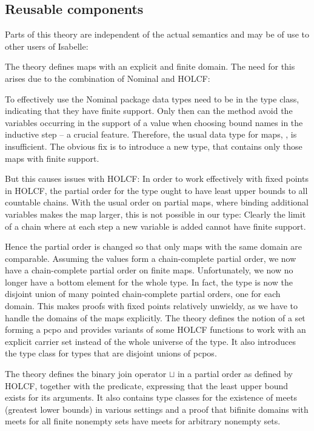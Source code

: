 \documentclass[11pt,a4paper,parskip=half]{scrartcl}
\begin{document}
\subsection{Reusable components}

Parts of this theory are independent of the actual semantics and may be of use to other users of Isabelle:

The theory  defines maps with an explicit and finite domain. The need for this arises due to the combination of Nominal and HOLCF:

To effectively use the Nominal package data types need to be in the  type class, indicating that they have finite support. Only then can the  method avoid the variables occurring in the support of a value when choosing bound names in the inductive step -- a crucial feature. Therefore, the usual data type for maps, , is insufficient. The obvious fix is to introduce a new type,  that contains only those maps with finite support.

But this causes issues with HOLCF: In order to work effectively with fixed points in HOLCF, the partial order for the type ought to have least upper bounds to all countable chains. With the usual order on partial maps, where binding additional variables makes the map larger, this is not possible in our type: Clearly the limit of a chain where at each step a new variable is added cannot have finite support.

Hence the partial order is changed so that only maps with the same domain are comparable. Assuming the values form a chain-complete partial order, we now have a chain-complete partial order on finite maps. Unfortunately, we now no longer have a bottom element for the whole type. In fact, the type is now the disjoint union of many pointed chain-complete partial orders, one for each domain. This makes proofs with fixed points relatively unwieldy, as we have to handle the domains of the maps explicitly. The theory  defines the notion of a set forming a pcpo and provides variants of some HOLCF functions to work with an explicit carrier set instead of the whole universe of the type. It also introduces the type class  for types that are disjoint unions of pcpos.

The theory  defines the binary join operator $\sqcup$ in a partial order as defined by HOLCF, together with the  predicate, expressing that the least upper bound exists for its arguments. It also contains type classes for the existence of meets (greatest lower bounds) in various settings and a proof that bifinite domains with meets for all finite nonempty sets have meets for arbitrary nonempty sets.
\end{document}

